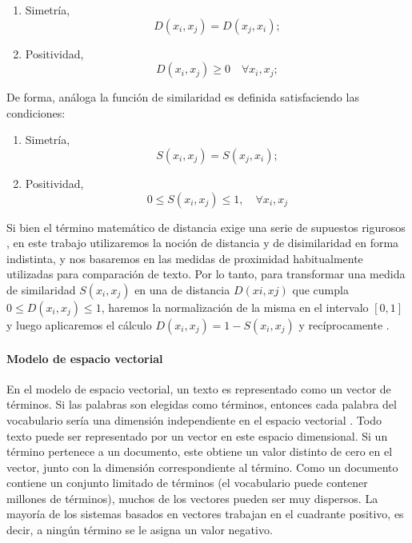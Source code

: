 \begin{enumerate}
	\item Simetría,
	\[D(x_i,x_j)=D(x_j,x_i);\]

	\item Positividad,
	\[D(x_i,x_j) \geq 0 \quad \forall x_i,x_j;\]
\end{enumerate}

De forma, análoga la función de similaridad es definida satisfaciendo las condiciones:
\begin{enumerate}
	\item Simetría,
	\[S(x_i,x_j)=S(x_j,x_i);\]

	\item Positividad,
	\[0 \leq S(x_i,x_j) \leq 1, \quad \forall x_i,x_j\]
\end{enumerate}

Si bien el término matemático de distancia exige una serie de supuestos rigurosos \citep{xu2008clustering}, en este trabajo utilizaremos la noción de distancia y de disimilaridad en forma indistinta, y nos basaremos en las medidas de proximidad habitualmente utilizadas para comparación de texto. Por lo tanto, para transformar una medida de similaridad \(S(x_i,x_j)\) en una de distancia \(D(xi,xj)\) que cumpla \(0 \leq D(x_i,x_j) \leq 1\), haremos la normalización de la misma en el intervalo \([0,1]\) y luego aplicaremos el cálculo \(D(x_i,x_j) = 1 - S(x_i,x_j)\) y recíprocamente \citep{leale2013novel}.

\paragraph{Modelo de espacio vectorial}
En el modelo de espacio vectorial, un texto es representado como un vector de términos. Si las palabras son elegidas como términos, entonces cada palabra del vocabulario sería una dimensión independiente en el espacio vectorial \citep{singhal2001modern}. Todo texto puede ser representado por un vector en este espacio dimensional. Si un término pertenece a un documento, este obtiene un valor distinto de cero en el vector, junto con la dimensión correspondiente al término. Como un documento contiene un conjunto limitado de términos (el vocabulario puede contener millones de términos), muchos de los vectores pueden ser muy dispersos. La mayoría de los sistemas basados en vectores trabajan en el cuadrante positivo, es decir, a ningún término se le asigna un valor negativo.

